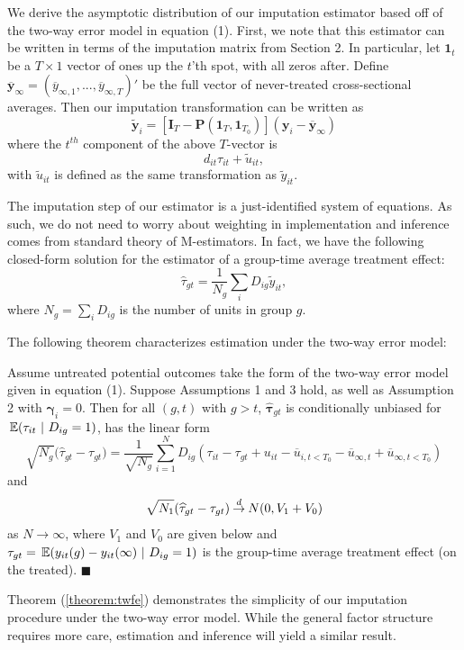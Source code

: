 \documentclass[12pt]{article}
\begin{document}
We derive the asymptotic distribution of our imputation estimator based off of the two-way error model in equation (1). First, we note that this estimator can be written in terms of the imputation matrix from Section 2. In particular, let $\bm 1_t$ be a $T \times 1$ vector of ones up the $t$'th spot, with all zeros after. Define $\overline{\bm y}_{\infty} = (\overline{y}_{\infty, 1},..., \overline{y}_{\infty, T})'$ be the full vector of never-treated cross-sectional averages. Then our imputation transformation can be written as 
\begin{equation}
    \tilde{\bm y}_i = \left[ \bm I_T - \bm P(\bm 1_T, \bm 1_{T_0}) \right] (\bm y_i - \overline{\bm y}_{\infty})
\end{equation}
where the $t^{th}$ component of the above $T$-vector is 
\begin{equation}
    d_{it} \tau_{it} + \tilde{u}_{it},
\end{equation}
with $\tilde{u}_{it}$ is defined as the same transformation as $\tilde{y}_{it}$.

The imputation step of our estimator is a just-identified system of equations. As such, we do not need to worry about weighting in implementation and inference comes from standard theory of M-estimators. In fact, we have the following closed-form solution for the estimator of a group-time average treatment effect: 
\begin{equation}
    \widehat{\tau}_{gt} = \frac{1}{N_{g}}\sum_{i} D_{ig} \tilde{y}_{it},
\end{equation}
where $N_{g} = \sum_i D_{ig}$ is the number of units in group $g$. 

The following theorem characterizes estimation under the two-way error model:
\begin{theorem}\label{theorem:twfe}
    Assume untreated potential outcomes take the form of the two-way error model given in equation (1). Suppose Assumptions 1 and 3 hold, as well as Assumption 2 with $\bm \gamma_i = 0$. Then for all $(g, t)$ with $g > t$, $\widehat{\bm \tau}_{gt}$ is conditionally unbiased for $\expec{\tau_{it}}{D_{ig} = 1}$, has the linear form
    \begin{equation}\label{eq:twfe_influence}
        \sqrt{N_{g}} \big( \widehat{\tau}_{gt} - \tau_{gt} \big) 
        = \frac{1}{\sqrt{N_{g}}}\sum_{i=1}^N D_{ig} (\tau_{it} - \tau_{gt} + u_{it} - \overline{u}_{i,t < T_0} - \overline{u}_{\infty,t} + \overline{u}_{\infty,t < T_0})
    \end{equation}
    and  
    \begin{equation}\label{eq:twfe_asymptotic}
        \sqrt{N_1}(\widehat{\tau}_{gt} - \tau_{gt}) \mathbin{\overset{d}{\to}} N(0, V_1 + V_0)
    \end{equation}
    as $N \rightarrow \infty$, where $V_1$ and $V_0$ are given below and $\tau_{gt} = \expec{y_{it}(g) - y_{it}(\infty)}{D_{ig} = 1}$ is the group-time average treatment effect (on the treated). $\blacksquare$
\end{theorem}
Theorem (\ref{theorem:twfe}) demonstrates the simplicity of our imputation procedure under the two-way error model. While the general factor structure requires more care, estimation and inference will yield a similar result.
\end{document}
